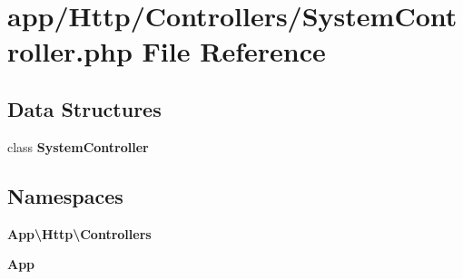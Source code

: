 \section{app/\+Http/\+Controllers/\+System\+Controller.php File Reference}
\label{_system_controller_8php}
\subsection*{Data Structures}
\begin{DoxyCompactItemize}
\item 
class {\bf System\+Controller}
\end{DoxyCompactItemize}
\subsection*{Namespaces}
\begin{DoxyCompactItemize}
\item 
 {\bf App\textbackslash{}\+Http\textbackslash{}\+Controllers}
\item 
 {\bf App}
\end{DoxyCompactItemize}
